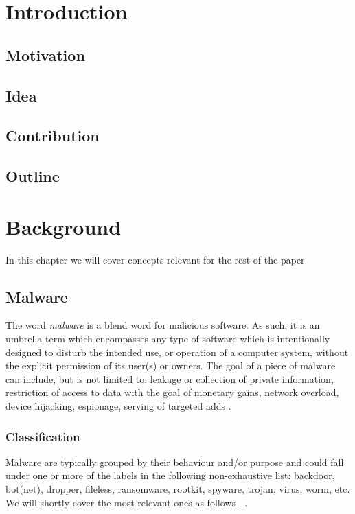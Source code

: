 \chapter{Introduction}

\section{Motivation}

\section{Idea}

\section{Contribution}

\section{Outline}

\chapter{Background}

In this chapter we will cover concepts relevant for the rest of the paper. %

\section{Malware}

The word \emph{malware} is a blend word for malicious software. As such, it is an umbrella term which encompasses any type of software which is intentionally designed to disturb the intended use, or operation of a computer system, without the explicit permission of its user(s) or owners. The goal of a piece of malware can include, but is not limited to: leakage or collection of private information, restriction of access to data with the goal of monetary gains, network overload, device hijacking, espionage, serving of targeted adds \cite{wiki_malware}.

\subsection{Classification}

Malware are typically grouped by their behaviour and/or purpose and could fall under one or more of the labels in the following non-exhaustive list: backdoor, bot(net), dropper, fileless, ransomware, rootkit, spyware, trojan, virus, worm, etc. We will shortly cover the most relevant ones as follows \cite{wiki_malware}, \cite{zeusvm}.

